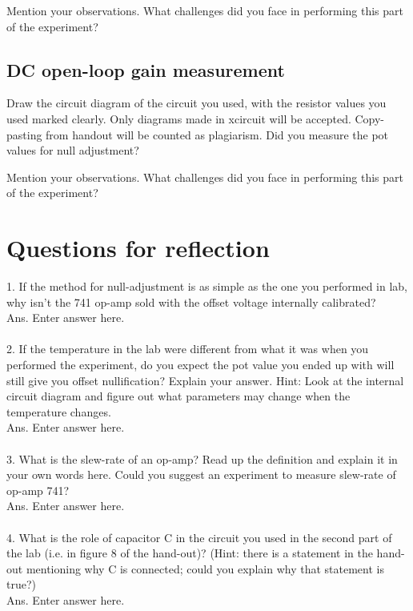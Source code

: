 \documentclass[12pt]{article}
\begin{document}
Mention your observations. What challenges did you face in performing this part of the experiment?

\subsection{DC open-loop gain measurement}

Draw the circuit diagram of the circuit you used, with the resistor values you used marked clearly. Only diagrams made in xcircuit will be accepted. Copy-pasting from handout will be counted as plagiarism. Did you measure the pot values for null adjustment?

Mention your observations. What challenges did you face in performing this part of the experiment?

\section{Questions for reflection}

1. If the method for null-adjustment is as simple as the one you performed in lab, why isn't the 741 op-amp sold with the offset voltage internally calibrated?\\
Ans. Enter answer here.
\\\\
2. If the temperature in the lab were different from what it was when you performed the experiment, do you expect the pot value you ended up with will still give you offset nullification? Explain your answer. Hint: Look at the internal circuit diagram and figure out what parameters may change when the temperature changes.\\
Ans. Enter answer here.
\\\\
3. What is the slew-rate of an op-amp? Read up the definition and explain it in your own words here. Could you suggest an experiment to measure slew-rate of op-amp 741?\\
Ans. Enter answer here.
\\\\
4. What is the role of capacitor C in the circuit you used in the second part of the lab (i.e. in figure 8 of the hand-out)? (Hint: there is a statement in the hand-out mentioning why C is connected; could you explain why that statement is true?)\\
Ans. Enter answer here.
\end{document}
